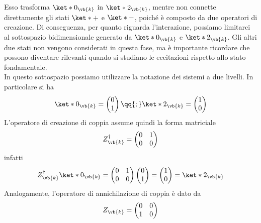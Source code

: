 \hspace{-0.6cm}Esso trasforma $\ket*{0_{\vb{k}}}$ in $\ket*{2_{\vb{k}}}$, mentre non connette direttamente gli stati $\ket*{+}$ e $\ket*{-}$, poiché è composto da due operatori di creazione. Di conseguenza, per quanto riguarda l'interazione, possiamo limitarci al sottospazio bidimensionale generato da $\ket*{0_{\vb{k}}}$ e $\ket*{2_{\vb{k}}}$. Gli altri due stati non vengono considerati in questa fase, ma è importante ricordare che possono diventare rilevanti quando si studiano le eccitazioni rispetto allo stato fondamentale.\\
In questo sottospazio possiamo utilizzare la notazione dei sistemi a due livelli. In particolare si ha
\begin{equation*}
   \ket*{0_{\vb{k}}}
   =\begin{pmatrix}
      0\\
      1
   \end{pmatrix}
   \qq{;}
   \ket*{2_{\vb{k}}}
   =\begin{pmatrix}
      1\\
      0
   \end{pmatrix}
\end{equation*}
L'operatore di creazione di coppia assume quindi la forma matriciale
\begin{equation*}
   Z^{\dag}_{\vb{k}}
   =\begin{pmatrix}
      0 & 1 \\
      0 & 0
   \end{pmatrix}
\end{equation*}
infatti
\begin{equation*}
   Z^{\dag}_{\vb{k}} \ket*{0_{\vb{k}}}
   =
   \begin{pmatrix}
      0 & 1 \\
      0 & 0
   \end{pmatrix}
   \begin{pmatrix}
      0\\
      1
   \end{pmatrix}
   =
   \begin{pmatrix}
      1\\
      0
   \end{pmatrix}
   =\ket*{2_{\vb{k}}}
\end{equation*}
Analogamente, l'operatore di annichilazione di coppia è dato da
\begin{equation*}
   Z_{\vb{k}}
   =\begin{pmatrix}
      0 & 0 \\
      1 & 0
   \end{pmatrix}
\end{equation*}
